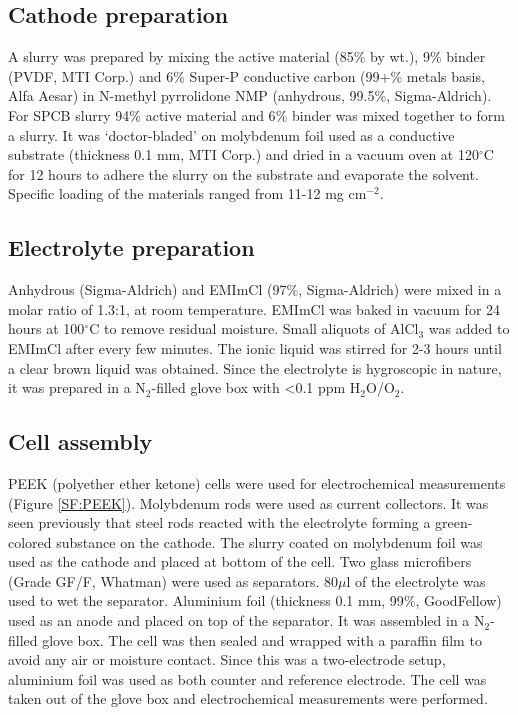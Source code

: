 \documentclass{article}
\begin{document}
\subsection{Cathode preparation}
A slurry was prepared by mixing the active material (85$\%$ by wt.), 9$\%$ binder (PVDF, MTI Corp.) and 6$\%$ Super-P conductive carbon (99+$\%$ metals basis, Alfa Aesar) in N-methyl pyrrolidone NMP (anhydrous, 99.5$\%$, Sigma-Aldrich). For SPCB slurry 94$\%$ active material and 6$\%$ binder was mixed together to form a slurry. It was ‘doctor-bladed’ on molybdenum foil used as a conductive substrate (thickness 0.1 mm, MTI Corp.) and dried in a vacuum oven at 120$^{\circ}$C for 12 hours to adhere the slurry on the substrate and evaporate the solvent. Specific loading of the materials ranged from 11-12 mg cm$^{-2}$. 

\subsection{Electrolyte preparation}
Anhydrous  (Sigma-Aldrich) and EMImCl (97$\%$, Sigma-Aldrich) were mixed in a molar ratio of 1.3:1, at room temperature. EMImCl was baked in vacuum for 24 hours at 100$^{\circ}$C to remove residual moisture. Small aliquots of AlCl$_3$ was added to EMImCl after every few minutes. The ionic liquid was stirred for 2-3 hours until a clear brown liquid was obtained. Since the electrolyte is hygroscopic in nature, it was prepared in a N$_2$-filled glove box with <0.1 ppm H$_2$O/O$_2$. 

\subsection{Cell assembly}
PEEK (polyether ether ketone) cells were used for electrochemical measurements (Figure \ref{SF:PEEK}). Molybdenum rods were used as current collectors. It was seen previously that steel rods reacted with the electrolyte forming a green-colored substance on the cathode. The slurry coated on molybdenum foil was used as the cathode and placed at bottom of the cell. Two glass microfibers (Grade GF/F, Whatman) were used as separators. 80$\mu$l of the electrolyte was used to wet the separator. Aluminium foil (thickness 0.1 mm, 99$\%$, GoodFellow) used as an anode and placed on top of the separator. It was assembled in a N$_2$-filled glove box. The cell was then sealed and wrapped with a paraffin film to avoid any air or moisture contact. Since this was a two-electrode setup, aluminium foil was used as both counter and reference electrode. The cell was taken out of the glove box and electrochemical measurements were performed. 
\end{document}
